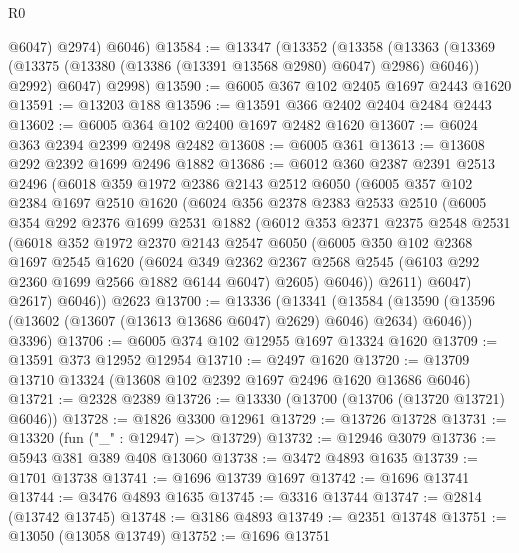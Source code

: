 \begin{lexlean}{R0}
\begin{coremodule}
          @6047)
        @2974)
      @6046)
@13584 := @13347
    (@13352
      (@13358
        (@13363 (@13369 (@13375 (@13380 (@13386 (@13391 @13568 @2980) @6047) @2986) @6046)) @2992)
        @6047)
      @2998)
@13590 := @6005 @367 @102 @2405 @1697 @2443 @1620
@13591 := @13203 @188
@13596 := @13591 @366 @2402 @2404 @2484 @2443
@13602 := @6005 @364 @102 @2400 @1697 @2482 @1620
@13607 := @6024 @363 @2394 @2399 @2498 @2482
@13608 := @6005 @361
@13613 := @13608 @292 @2392 @1699 @2496 @1882
@13686 := @6012
    @360
    @2387
    @2391
    @2513
    @2496
    (@6018
      @359
      @1972
      @2386
      @2143
      @2512
      @6050
      (@6005
        @357
        @102
        @2384
        @1697
        @2510
        @1620
        (@6024
          @356
          @2378
          @2383
          @2533
          @2510
          (@6005
            @354
            @292
            @2376
            @1699
            @2531
            @1882
            (@6012
              @353
              @2371
              @2375
              @2548
              @2531
              (@6018
                @352
                @1972
                @2370
                @2143
                @2547
                @6050
                (@6005
                  @350
                  @102
                  @2368
                  @1697
                  @2545
                  @1620
                  (@6024
                    @349
                    @2362
                    @2367
                    @2568
                    @2545
                    (@6103 @292 @2360 @1699 @2566 @1882 @6144 @6047)
                    @2605)
                  @6046))
              @2611)
            @6047)
          @2617)
        @6046))
    @2623
@13700 := @13336
    (@13341
      (@13584 (@13590 (@13596 (@13602 (@13607 (@13613 @13686 @6047) @2629) @6046) @2634) @6046))
      @3396)
@13706 := @6005 @374 @102 @12955 @1697 @13324 @1620
@13709 := @13591 @373 @12952 @12954
@13710 := @2497 @1620
@13720 := @13709 @13710 @13324 (@13608 @102 @2392 @1697 @2496 @1620 @13686 @6046)
@13721 := @2328 @2389
@13726 := @13330 (@13700 (@13706 (@13720 @13721) @6046))
@13728 := @1826 @3300 @12961
@13729 := @13726 @13728
@13731 := @13320 (fun ("_" : @12947) => @13729)
@13732 := @12946 @3079
@13736 := @5943 @381 @389 @408 @13060
@13738 := @3472 @4893 @1635
@13739 := @1701 @13738
@13741 := @1696 @13739 @1697
@13742 := @1696 @13741
@13744 := @3476 @4893 @1635
@13745 := @3316 @13744
@13747 := @2814 (@13742 @13745)
@13748 := @3186 @4893
@13749 := @2351 @13748
@13751 := @13050 (@13058 @13749)
@13752 := @1696 @13751

\end{coremodule}
\end{lexlean}
